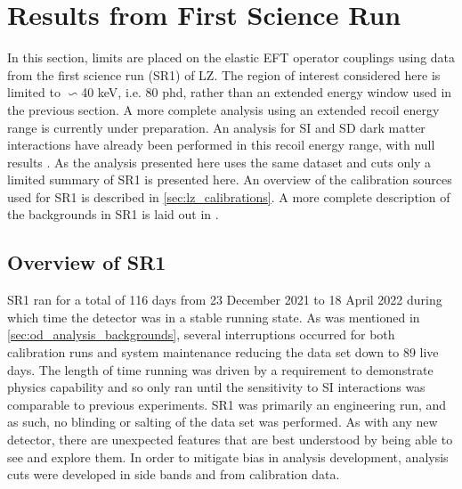 \section{Results from First Science Run}
\par
In this section, limits are placed on the elastic EFT operator couplings using data from the first science run (SR1) of LZ.
The region of interest considered here is limited to $\backsim$40 keV, i.e. 80 phd, rather than an extended energy window used in the previous section.
A more complete analysis using an extended recoil energy range is currently under preparation.
An analysis for SI and SD dark matter interactions have already been performed in this recoil energy range, with null results \cite{lz_ws_sr1_ref}.
As the analysis presented here uses the same dataset and cuts only a limited summary of SR1 is presented here.
An overview of the calibration sources used for SR1 is described in \autoref{sec:lz_calibrations}.
A more complete description of the backgrounds in SR1 is laid out in \cite{lz_sr1_backgrounds_ref}.

\subsection{Overview of SR1}
\par
SR1 ran for a total of 116 days from 23 December 2021 to 18 April 2022 during which time the detector was in a stable running state.
As was mentioned in \autoref{sec:od_analysis_backgrounds}, several interruptions occurred for both calibration runs and system maintenance reducing the data set down to 89 live days.
The length of time running was driven by a requirement to demonstrate physics capability and so only ran until the sensitivity to SI interactions was comparable to previous experiments.
SR1 was primarily an engineering run, and as such, no blinding or salting of the data set was performed.
As with any new detector, there are unexpected features that are best understood by being able to see and explore them.
In order to mitigate bias in analysis development, analysis cuts were developed in side bands and from calibration data.

